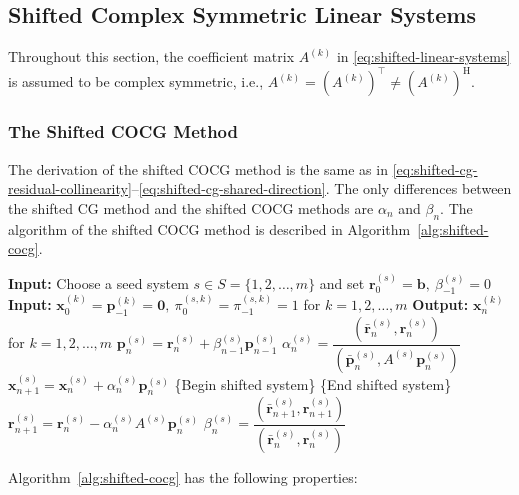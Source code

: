 \subsection{{Shifted Complex Symmetric Linear Systems}}\label{sec:shifted-complex-symmetric-systems}
{Throughout this section, the coefficient matrix $A^{(k)}$ in \eqref{eq:shifted-linear-systems} is assumed to be complex symmetric, i.e., $A^{(k)}=(A^{(k)})^{\top}\ne(A^{(k)})^{\mathrm H}$.}
\subsubsection{{The Shifted COCG Method}}\label{subsec:shifted-cocg}
{The derivation of the shifted COCG method  is the same as in \eqref{eq:shifted-cg-residual-collinearity}--\eqref{eq:shifted-cg-shared-direction}. The only differences between the shifted CG method and the shifted COCG methods are $\alpha_n$ and $\beta_n$. The algorithm of the shifted COCG method is described in Algorithm\ \ref{alg:shifted-cocg}.}
\begin{algorithm}[H]\caption{{The shifted COCG method (note: $(\bar{\bm a},\bm b)=\bm a^{\top}\bm b$)}}\label{alg:shifted-cocg}\begin{algorithmic}[1]
\Statex\textbf{Input:} {Choose a seed system $s\in S=\{1,2,\ldots,m\}$ and set $\bm r_0^{(s)}=\bm b,\ \beta_{-1}^{(s)}=0$}
\Statex\textbf{Input:} $\bm x_0^{(k)}=\bm p_{-1}^{(k)}=\bm0,\ \pi_0^{(s,k)}=\pi_{-1}^{(s,k)}=1$ {for} $k=1,2,\ldots,m$
\Statex\textbf{Output:} $\bm x_n^{(k)}$ {for} $k=1,2,\ldots,m$
\State $\bm p_n^{(s)}=\bm r_n^{(s)}+\beta_{n-1}^{(s)}\bm p_{n-1}^{(s)}$
\State $\alpha_n^{(s)}=\dfrac{(\bar{\bm r}_n^{(s)},\bm r_n^{(s)})}{(\bar{\bm p}_n^{(s)},A^{(s)}\bm p_n^{(s)})}$
\State $\bm x_{n+1}^{(s)}=\bm x_n^{(s)}+\alpha_n^{(s)}\bm p_n^{(s)}$
\State \{{Begin shifted system}\}
\State \{{End shifted system}\}
\State $\bm r_{n+1}^{(s)}=\bm r_n^{(s)}-\alpha_n^{(s)}A^{(s)}\bm p_n^{(s)}$
\State $\beta_n^{(s)}=\dfrac{(\bar{\bm r}_{n+1}^{(s)},\bm r_{n+1}^{(s)})}{(\bar{\bm r}_n^{(s)},\bm r_n^{(s)})}$
\EndFor\end{algorithmic}\end{algorithm}
{Algorithm\ \ref{alg:shifted-cocg} has the following properties:}
